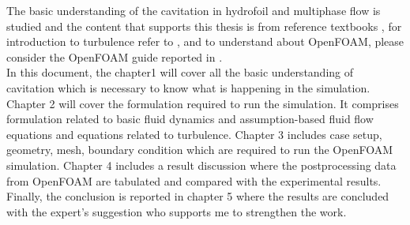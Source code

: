 The basic understanding of the cavitation in hydrofoil and multiphase
flow is studied and the content that supports this thesis is from
reference textbooks \cite{FundamentalsofCavitation.2004,
  CavitationandBubbleDynamics.1995, brennen2005}, for introduction
to turbulence refer to \cite{pope2000,ANSYS}, and to understand about
OpenFOAM, please consider the OpenFOAM guide reported in \cite{OpenFoam}.\\ In this document, the chapter1 will cover all the
basic understanding of cavitation which is necessary to know what
is happening in the simulation. Chapter 2 will cover the formulation
required to run the simulation. It comprises formulation related to
basic fluid dynamics and assumption-based fluid flow equations and
equations related to turbulence. Chapter 3 includes case setup, geometry, mesh, boundary condition which are required to run the
OpenFOAM simulation.  Chapter 4 includes a result discussion where the
postprocessing data from OpenFOAM are tabulated and compared with the
experimental results. Finally, the conclusion is reported in chapter 5 where the results are
concluded with the expert's suggestion who supports me to strengthen
the work.\\


